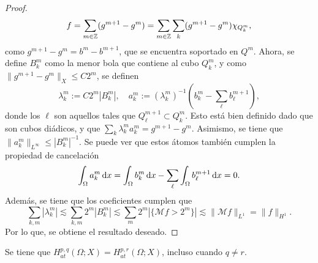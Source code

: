 \begin{proof}
	\begin{equation*}
		f = \sum_{m\in\mathbb{Z}} (g^{m+1}-g^m) = \sum_{m\in\mathbb{Z}}\sum_k (g^{m+1}-g^m)\chi_{Q_k^m},
	\end{equation*}
	como $g^{m+1}-g^m = b^m - b^{m+1}$, que se encuentra soportado en $Q^m$. Ahora, se define $B_k^m$ como la menor bola que contiene al cubo $Q_k^m$, y como $\|g^{m+1}-g^{m}\|_X \leq C2^{m}$, se definen
	\begin{equation*}
		\lambda_k^m := C 2^m |B_k^m|, \quad a_k^m := (\lambda_k^m)^{-1} \left(b_k^m - \sum_\ell b_\ell^{m+1}\right),
	\end{equation*}
	donde los $\ell$ son aquellos tales que $Q_\ell^{m+1}\subset Q_k^m$. Esto está bien definido dado que son cubos diádicos, y que $\sum_k \lambda_k^ma_k^m = g^{m+1}-g^m$. Asimismo, se tiene que $\|a_k^m\|_{L^\infty} \leq |B_k^m|^{-1}$. Se puede ver que estos átomos también cumplen la propiedad de cancelación
	\begin{equation*}
		\int_{\Omega}a_k^m \mathop{}\!\mathrm{d} x = \int_{\Omega} b_k^m \mathop{}\!\mathrm{d} x -\sum_\ell  \int_{\Omega} b^{m+1}_\ell\mathop{}\!\mathrm{d} x = 0.
	\end{equation*}
	Además, se tiene que los coeficientes cumplen que 
	\begin{equation*}
		\sum_{k,m} |\lambda_k^m|  \lesssim \sum_{k,m} 2^m|B_k^m| \lesssim \sum_m 2^m|\{\mathcal{M}f>2^m\}|  \lesssim \| \mathcal{M}f\|_{L^1} = \|f\|_{H^1}.
	\end{equation*}
	Por lo que, se obtiene el resultado deseado.
\end{proof}
\begin{theorem}
	Se tiene que $H^{p,q}_{at}(\Omega;X) = H^{p,r}_{at}(\Omega;X)$, incluso cuando $q\neq r$.
\end{theorem}

